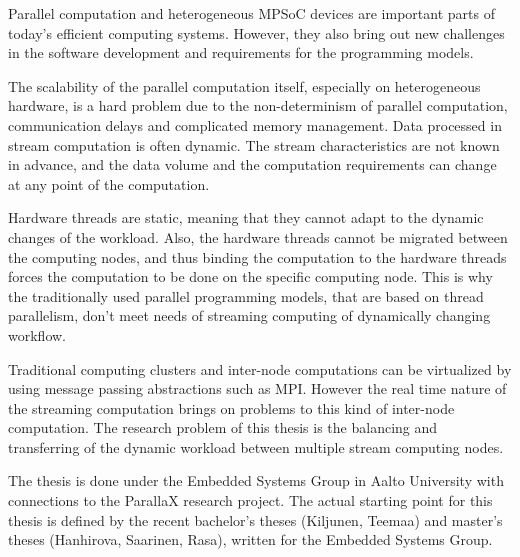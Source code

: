 Parallel computation and heterogeneous MPSoC devices are important parts of today's efficient computing systems. However, they also bring out new challenges in the software development and requirements for the programming models.

The scalability of the parallel computation itself, especially on heterogeneous hardware, is a hard problem due to the non-determinism of parallel computation, communication delays and complicated memory management. Data processed in stream computation is often dynamic. The stream characteristics are not known in advance, and the data volume and the computation requirements can change at any point of the computation.

Hardware threads are static, meaning that they cannot adapt to the dynamic changes of the workload. Also, the hardware threads cannot be migrated between the computing nodes, and thus binding the computation to the hardware threads forces the computation to be done on the specific computing node. This is why the traditionally used parallel programming models, that are based on thread parallelism, don't meet needs of streaming computing of dynamically changing workflow.

Traditional computing clusters and inter-node computations can be virtualized by using message passing abstractions such as MPI. However the real time nature of the streaming computation brings on problems to this kind of inter-node computation. The research problem of this thesis is the balancing and transferring of the dynamic workload between multiple stream computing nodes.

The thesis is done under the Embedded Systems Group in Aalto University with connections to the ParallaX research project. The actual starting point for this thesis is defined by the recent bachelor's theses (Kiljunen, Teemaa) and master's theses (Hanhirova, Saarinen, Rasa), written for the Embedded Systems Group.

